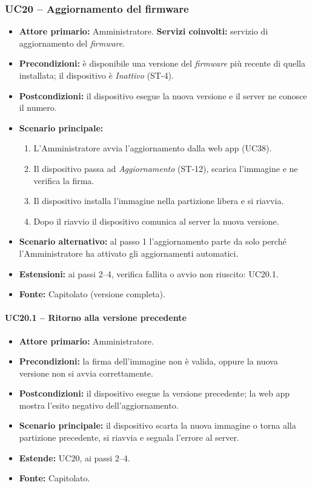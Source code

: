 \documentclass[12pt,a4paper]{article}
\newcommand{\tightlist}{\setlength{\itemsep}{1pt}\setlength{\parskip}{0pt}}
\begin{document}
\subsubsection{UC20 -- Aggiornamento del firmware}
\begin{itemize}
\tightlist
\item \textbf{Attore primario:} Amministratore. \textbf{Servizi coinvolti:} servizio di aggiornamento del \emph{firmware}.
\item \textbf{Precondizioni:} è disponibile una versione del \emph{firmware} più recente di quella installata; il dispositivo è \emph{Inattivo} (ST-4).
\item \textbf{Postcondizioni:} il dispositivo esegue la nuova versione e il server ne conosce il numero.
\item \textbf{Scenario principale:}
\begin{enumerate}
\tightlist
\item L'Amministratore avvia l'aggiornamento dalla web app (UC38).
\item Il dispositivo passa ad \emph{Aggiornamento} (ST-12), scarica l'immagine e ne verifica la firma.
\item Il dispositivo installa l'immagine nella partizione libera e si riavvia.
\item Dopo il riavvio il dispositivo comunica al server la nuova versione.
\end{enumerate}
\item \textbf{Scenario alternativo:} al passo 1 l'aggiornamento parte da solo perché l'Amministratore ha attivato gli aggiornamenti automatici.
\item \textbf{Estensioni:} ai passi 2--4, verifica fallita o avvio non riuscito: UC20.1.
\item \textbf{Fonte:} Capitolato (versione completa).
\end{itemize}

\paragraph{UC20.1 -- Ritorno alla versione precedente}
\begin{itemize}
\tightlist
\item \textbf{Attore primario:} Amministratore.
\item \textbf{Precondizioni:} la firma dell'immagine non è valida, oppure la nuova versione non si avvia correttamente.
\item \textbf{Postcondizioni:} il dispositivo esegue la versione precedente; la web app mostra l'esito negativo dell'aggiornamento.
\item \textbf{Scenario principale:} il dispositivo scarta la nuova immagine o torna alla partizione precedente, si riavvia e segnala l'errore al server.
\item \textbf{Estende:} UC20, ai passi 2--4.
\item \textbf{Fonte:} Capitolato.
\end{itemize}
\end{document}
